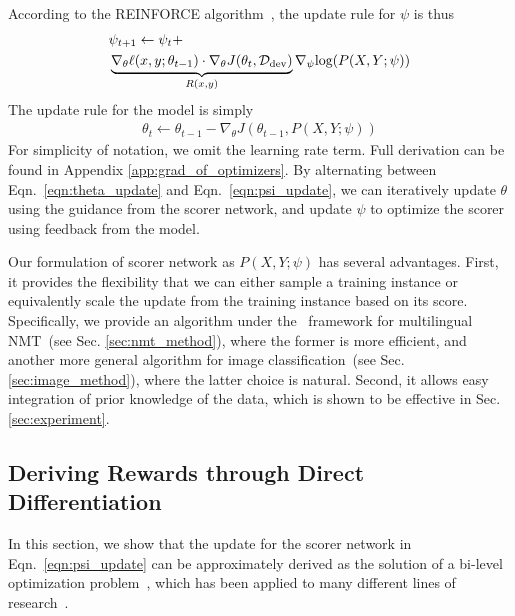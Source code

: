 According to the REINFORCE algorithm~\citep{reinforce}, the update rule for $\psi$ is thus
\begin{equation}
\label{eqn:psi_update}
\begin{aligned}
    & \psi_{t+1} \leftarrow  \psi_t + \\
    &  \underbrace{\nabla_\theta \ell(x, y; \theta_{t-1}) \cdot \nabla_\theta J(\theta_t, \mathcal{D}_\text{dev})}_{\mathclap{R(x, y)}} \nabla_\psi \text{log}(P(X, Y;\psi))
\end{aligned}
\end{equation}
The update rule for the model is simply
\begin{align}
    \label{eqn:theta_update}
    \theta_t \leftarrow \theta_{t-1} - \nabla_\theta J(\theta_{t-1}, P(X, Y;\psi))
\end{align}
For simplicity of notation, we omit the learning rate term. Full derivation can be found in Appendix \ref{app:grad_of_optimizers}. By alternating between Eqn.~\ref{eqn:theta_update} and Eqn.~\ref{eqn:psi_update}, we can iteratively update $\theta$ using the guidance from the scorer network, and update $\psi$ to optimize the scorer using feedback from the model.  

Our formulation of scorer network as $P(X, Y; \psi)$ has several advantages. First, it provides the flexibility that we can either sample a training instance or equivalently scale the update from the training instance based on its score. Specifically, we provide an algorithm under the \dds~framework for multilingual NMT~(see Sec. \ref{sec:nmt_method}), where the former is more efficient, and another more general algorithm for image classification~(see Sec. \ref{sec:image_method}), where the latter choice is natural. Second, it allows easy integration of prior knowledge of the data, which is shown to be effective in Sec. \ref{sec:experiment}. 

\subsection{\label{sec:diff_data_selection}Deriving Rewards through Direct Differentiation}
In this section, we show that the update for the scorer network in Eqn.~\ref{eqn:psi_update} can be approximately derived as the solution of a bi-level optimization problem~\citep{bilevel_optim}, which has been applied to many different lines of research~\citep{hyper_grad,darts,learn_reweight}. 

